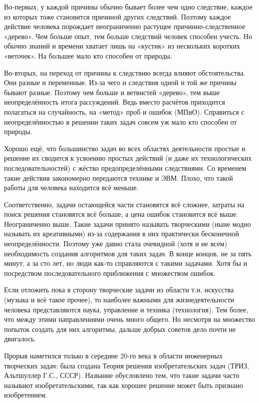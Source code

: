 \documentclass[11pt,a4paper]{article}
\begin{document}
Во-первых, у каждой причины обычно бывает более чем одно следствие, каждое из которых тоже становится причиной других следствий. Поэтому каждое действие человека порождает неограниченно растущее причинно-следственное «дерево». Чем больше опыт, тем больше следствий человек способен учесть. Но обычно знаний и времени хватает лишь на «кустик» из нескольких коротких «веточек». На большее мало кто способен от природы.

Во-вторых, на переход от причины к следствию всегда влияют обстоятельства. Они разные и переменные. Из-за чего и следствия одной и той же причины бывают разные. Поэтому чем больше и ветвистей «дерево», тем выше неопределённость итога рассуждений. Ведь вместо расчётов приходится полагаться на случайность, на «метод» проб и ошибок (МПиО). Справиться с неопределённостью в решении таких задач совсем уж мало кто способен от природы.

Хорошо ещё, что большинство задач во всех областях деятельности простые и решение их сводится к усвоению простых действий (и даже их технологических последовательностей) с жёстко предопределёнными следствиями. Со временем такие действия закономерно передаются технике и ЭВМ. Плохо, что такой работы для человека находится всё меньше.

Соответственно, задачи остающейся части становятся всё сложнее, затраты на поиск решения становятся всё больше, а цена ошибок становится всё выше. Неограниченно выше. Такие задачи принято называть творческими (ныне модно называть их креативными) из-за содержания в них практически бесконечной неопределённости. Поэтому уже давно стала очевидной (хотя и не всем) необходимость создания алгоритмов для таких задач. В конце концов, не за пять минут, а за сто лет, но люди как-то справляются с такими задачами. Хотя бы и посредством последовательного приближения с множеством ошибок.

Если отложить пока в сторону творческие задачи из области т.н. искусства (музыка и всё такое прочее), то наиболее важными для жизнедеятельности человека представляются наука, управление и техника (технология). Тем более, что между этими направлениями очень много общего. Но несмотря на множество попыток создать для них алгоритмы, дальше добрых советов дело почти не двигалось.

Прорыв наметился только в середине 20-го века в области инженерных творческих задач: была создана Теория решения изобретательских задач (ТРИЗ, Альтшуллер Г.С., СССР). Название обусловлено тем, что такие задачи часто называют изобретательскими, так как хорошее решение может быть признано изобретением.
\end{document}
